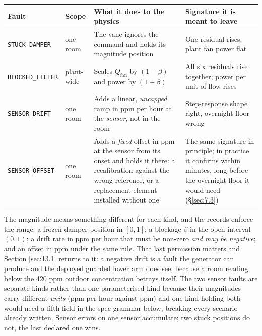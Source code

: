 \begin{longtable}[]{@{}
  >{\raggedright\arraybackslash}p{}
  >{\raggedright\arraybackslash}p{}
  >{\raggedright\arraybackslash}p{}
  >{\raggedright\arraybackslash}p{}@{}}
\toprule
\textbf{Fault} & \textbf{Scope} & \textbf{What it does to the physics} & \textbf{Signature it is
meant to leave} \\
\midrule
\endhead
\texttt{STUCK\_DAMPER} & one room & The vane ignores the command and holds its magnitude position
& One residual rises; plant fan power flat\\*
\texttt{BLOCKED\_FILTER} & plant-wide & Scales $Q_\text{fan}$ by $(1-\beta)$ and power by
$(1+\beta)$ & All six residuals rise together; power per unit of flow rises\\*
\texttt{SENSOR\_DRIFT} & one room & Adds a linear, \emph{uncapped} ramp in ppm per hour at the
\emph{sensor}, not in the room & Step-response shape right, overnight floor wrong\\*
\texttt{SENSOR\_OFFSET} & one room & Adds a \emph{fixed} offset in ppm at the sensor from its onset
and holds it there: a recalibration against the wrong reference, or a replacement element
installed without one & The same signature in principle; in practice it confirms within minutes,
long before the overnight floor it would need (§\ref{sec:7.3}) \\
\bottomrule
\end{longtable}

The magnitude means something different for each kind, and the records enforce the range: a frozen
damper position in $[0,1]$; a blockage $\beta$ in the open interval $(0,1)$; a drift rate in ppm per
hour that must be non-zero \emph{and may be negative}; and an offset in ppm under the same rule.
That last permission matters and Section \ref{sec:13.1} returns to it: a negative drift is a fault the
generator can produce and the deployed guarded lower arm does see, because a room reading below
the 420 ppm outdoor concentration betrays itself. The two sensor faults are separate
kinds rather than one parameterised kind because their magnitudes carry different \emph{units} (ppm
per hour against ppm) and one kind holding both would need a fifth field in the spec grammar
below, breaking every scenario already written. Sensor errors on one sensor accumulate; two stuck
positions do not, the last declared one wins.

